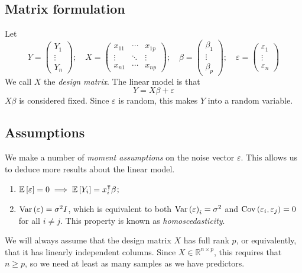 \subsection{Matrix formulation}
Let
\[
	Y = \begin{pmatrix}
		Y_1    \\
		\vdots \\
		Y_n
	\end{pmatrix};\quad X = \begin{pmatrix}
		x_{11} & \cdots & x_{1p} \\
		\vdots & \ddots & \vdots \\
		x_{n1} & \cdots & x_{np}
	\end{pmatrix};\quad \beta = \begin{pmatrix}
		\beta_1 \\
		\vdots  \\
		\beta_p
	\end{pmatrix};\quad \varepsilon = \begin{pmatrix}
		\varepsilon_1 \\
		\vdots        \\
		\varepsilon_n
	\end{pmatrix}
\]
We call \( X \) the \textit{design matrix}.
The linear model is that
\[
	Y = X\beta + \varepsilon
\]
\( X\beta \) is considered fixed.
Since \( \varepsilon \) is random, this makes \( Y \) into a random variable.

\subsection{Assumptions}
We make a number of \textit{moment assumptions} on the noise vector \( \varepsilon \).
This allows us to deduce more results about the linear model.
\begin{enumerate}
	\item \( \mathbb{E}\left[{\varepsilon}\right] = 0 \implies \mathbb{E}\left[{Y_i}\right] = x_i^\intercal \beta \);
	\item \( \operatorname{Var}\left({\varepsilon}\right) = \sigma^2 I \), which is equivalent to both \( \operatorname{Var}\left({\varepsilon}\right)_i = \sigma^2 \) and \( \operatorname{Cov}\left({\varepsilon_i, \varepsilon_j}\right) = 0 \) for all \( i \neq j \).
	      This property is known as \textit{homoscedasticity}.
\end{enumerate}
We will always assume that the design matrix \( X \) has full rank \( p \), or equivalently, that it has linearly independent columns.
Since \( X \in \mathbb R^{n \times p} \), this requires that \( n \geq p \), so we need at least as many samples as we have predictors.

